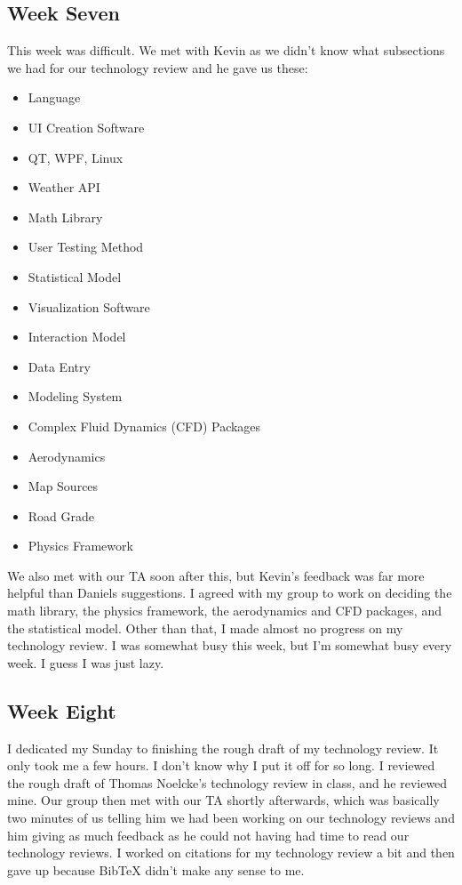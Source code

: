 \begin{singlespace}
\subsection{Week Seven}
This week was difficult.
We met with Kevin as we didn't know what subsections we had for our technology review and he gave us these:
\begin{itemize}
    \item Language
    \item UI Creation Software
    \item QT, WPF, Linux
    \item Weather API
    \item Math Library
    \item User Testing Method
    \item Statistical Model
    \item Visualization Software
    \item Interaction Model
    \item Data Entry
    \item Modeling System
    \item Complex Fluid Dynamics (CFD) Packages
    \item Aerodynamics
    \item Map Sources
    \item Road Grade
    \item Physics Framework
\end{itemize}
We also met with our TA soon after this, but Kevin's feedback was far more helpful than Daniels suggestions.
I agreed with my group to work on deciding the math library, the physics framework, the aerodynamics and CFD packages, and the statistical model.
Other than that, I made almost no progress on my technology review.
I was somewhat busy this week, but I'm somewhat busy every week.
I guess I was just lazy.

\subsection{Week Eight}
I dedicated my Sunday to finishing the rough draft of my technology review.
It only took me a few hours.
I don't know why I put it off for so long.
I reviewed the rough draft of Thomas Noelcke's technology review in class, and he reviewed mine.
Our group then met with our TA shortly afterwards, which was basically two minutes of us telling him we had been working on our technology reviews and him giving as much feedback as he could not having had time to read our technology reviews.
I worked on citations for my technology review a bit and then gave up because BibTeX didn't make any sense to me.


\end{singlespace}
